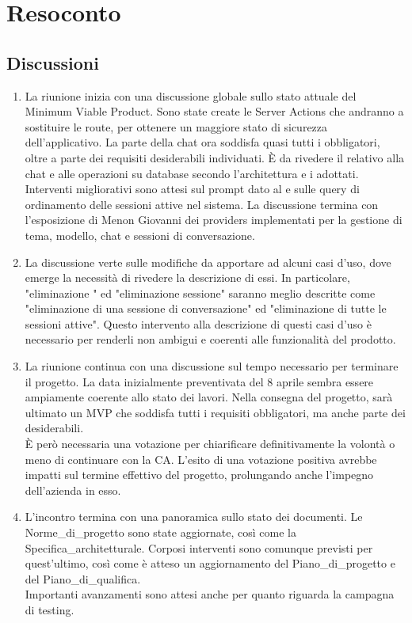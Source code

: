 \section{Resoconto} \label{sec:resoconto}
\subsection{Discussioni} \label{subsec:resdiscussione}
\begin{enumerate}
    \item La riunione inizia con una discussione globale sullo stato attuale del Minimum Viable Product. Sono state create le Server Actions che andranno a sostituire le  route, per ottenere un maggiore stato di sicurezza dell'applicativo. La parte della chat ora soddisfa quasi tutti i  obbligatori, oltre a parte dei requisiti desiderabili individuati. È da rivedere il  relativo alla chat e alle operazioni su database secondo l'architettura e i  adottati. Interventi migliorativi sono attesi sul prompt dato al  e sulle query di ordinamento delle sessioni attive nel sistema. La discussione termina con l'esposizione di Menon Giovanni dei providers implementati per la gestione di tema, modello, chat e sessioni di conversazione.
    \item La discussione verte sulle modifiche da apportare ad alcuni casi d'uso, dove emerge la necessità di rivedere la descrizione di essi. In particolare, "eliminazione " ed "eliminazione sessione" saranno meglio descritte come "eliminazione di una sessione di conversazione" ed "eliminazione di tutte le sessioni attive". Questo intervento alla descrizione di questi casi d'uso è necessario per renderli non ambigui e coerenti alle funzionalità del prodotto.
    \item La riunione continua con una discussione sul tempo necessario per terminare il progetto. La data inizialmente preventivata del 8 aprile sembra essere ampiamente coerente allo stato dei lavori. Nella consegna del progetto, sarà ultimato un MVP che soddisfa tutti i requisiti obbligatori, ma anche parte dei desiderabili.\\
    È però necessaria una votazione per chiarificare definitivamente la volontà o meno di continuare con la CA. L'esito di una votazione positiva avrebbe impatti sul termine effettivo del progetto, prolungando anche l'impegno dell'azienda  in esso.
    \item L'incontro termina con una panoramica sullo stato dei documenti. Le Norme\_di\_progetto sono state aggiornate, così come la Specifica\_architetturale. Corposi interventi sono comunque previsti per quest'ultimo, così come è atteso un aggiornamento del Piano\_di\_progetto e del Piano\_di\_qualifica.\\
    Importanti avanzamenti sono attesi anche per quanto riguarda la campagna di testing.
\end{enumerate}

